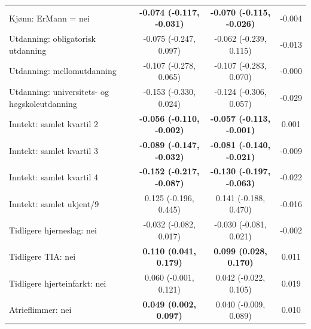 \begin{longtable}{p{5.2cm}ccc}
  Kjønn: ErMann = nei                                                        & \textbf{-0.074 (-0.117, -0.031)} & \textbf{-0.070 (-0.115, -0.026)} & -0.004                      \\
  Utdanning: obligatorisk utdanning                                          & -0.075 (-0.247, 0.097)           & -0.062 (-0.239, 0.115)           & -0.013                      \\
  Utdanning: mellomutdanning                                                 & -0.107 (-0.278, 0.065)           & -0.107 (-0.283, 0.070)           & -0.000                      \\
  Utdanning: universitets- og høgskoleutdanning                              & -0.153 (-0.330, 0.024)           & -0.124 (-0.306, 0.057)           & -0.029                      \\
  Inntekt: samlet kvartil 2                                                  & \textbf{-0.056 (-0.110, -0.002)} & \textbf{-0.057 (-0.113, -0.001)} & 0.001                       \\
  Inntekt: samlet kvartil 3                                                  & \textbf{-0.089 (-0.147, -0.032)} & \textbf{-0.081 (-0.140, -0.021)} & -0.009                      \\
  Inntekt: samlet kvartil 4                                                  & \textbf{-0.152 (-0.217, -0.087)} & \textbf{-0.130 (-0.197, -0.063)} & -0.022                      \\
  Inntekt: samlet ukjent/9                                                   & 0.125 (-0.196, 0.445)            & 0.141 (-0.188, 0.470)            & -0.016                      \\
  Tidligere hjerneslag: nei                                                  & -0.032 (-0.082, 0.017)           & -0.030 (-0.081, 0.021)           & -0.002                      \\
  Tidligere TIA: nei                                                         & \textbf{0.110 (0.041, 0.179)}    & \textbf{0.099 (0.028, 0.170)}    & 0.011                       \\
  Tidligere hjerteinfarkt: nei                                               & 0.060 (-0.001, 0.121)            & 0.042 (-0.022, 0.105)            & 0.019                       \\
  Atrieflimmer: nei                                                          & \textbf{0.049 (0.002, 0.097)}    & 0.040 (-0.009, 0.089)            & 0.010                       \\

\end{longtable}
